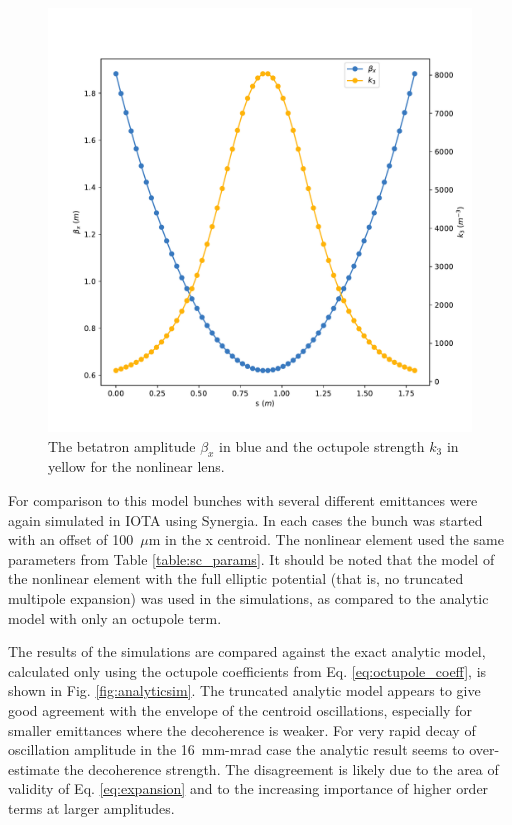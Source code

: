 \documentclass[aps,prstab,twocolumn, groupedaddress]{revtex4-1}
\begin{document}
\begin{figure}
	\includegraphics[width=0.85\columnwidth]{envelope.pdf}
	\caption{The betatron amplitude $\beta_x$ in blue and the octupole strength $k_3$ in 
		yellow for the nonlinear lens.}
	\label{fig:envelope_nl}
\end{figure}

For comparison to this model bunches with several different emittances were again 
simulated in 
IOTA using Synergia. In each cases the bunch was started with an 
offset of 100~$\mu$m in the x centroid. The nonlinear element used the same parameters 
from Table \ref{table:sc_params}.  It should be noted that the model of the nonlinear 
element with the full elliptic potential (that is, no truncated multipole expansion) was used 
in the simulations, as compared to the analytic model with only an octupole term. 

The results of the simulations are compared against the exact analytic model, calculated 
only using the octupole coefficients from Eq. \ref{eq:octupole_coeff}, is shown in Fig. 
\ref{fig:analyticsim}. The truncated analytic model appears to give good agreement with 
the 
envelope of the centroid oscillations, especially for smaller emittances where the 
decoherence is weaker. For very rapid decay of oscillation amplitude in the 
16~mm-mrad case the analytic result seems to over-estimate the decoherence strength. 
The disagreement is likely due to the area of validity of Eq. \ref{eq:expansion} and to the 
increasing importance of higher order terms at larger amplitudes.
\end{document}
